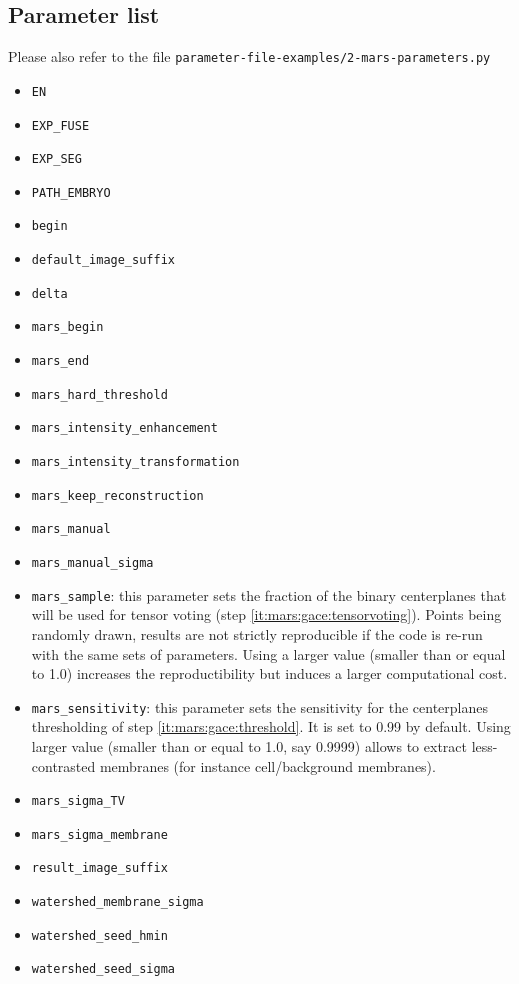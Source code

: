 \subsection{Parameter list}

Please also refer to the file
\texttt{parameter-file-examples/2-mars-parameters.py}

\begin{itemize}
\itemsep -1ex
\item \texttt{EN}
\item \texttt{EXP\_FUSE}
\item \texttt{EXP\_SEG}
\item \texttt{PATH\_EMBRYO}
\item \texttt{begin}
\item \texttt{default\_image\_suffix}
\item \texttt{delta}
\item \texttt{mars\_begin}
\item \texttt{mars\_end}
\item \texttt{mars\_hard\_threshold}
\item \texttt{mars\_intensity\_enhancement}
\item \texttt{mars\_intensity\_transformation}
\item \texttt{mars\_keep\_reconstruction}
\item \texttt{mars\_manual}
\item \texttt{mars\_manual\_sigma}
\item \texttt{mars\_sample}: this parameter sets the fraction of the binary centerplanes that will be used for tensor voting (step \ref{it:mars:gace:tensorvoting}). Points being randomly drawn, results are not strictly reproducible if the code is re-run with the same sets of parameters. Using a larger value (smaller than or equal to 1.0) increases the reproductibility but induces a larger computational cost.
\item \texttt{mars\_sensitivity}: this parameter sets the sensitivity for the centerplanes thresholding of step \ref{it:mars:gace:threshold}. It is set to 0.99 by default. Using larger value (smaller than or equal to 1.0, say 0.9999) allows to extract less-contrasted membranes (for instance cell/background membranes).
\item \texttt{mars\_sigma\_TV}
\item \texttt{mars\_sigma\_membrane}
\item \texttt{result\_image\_suffix}
\item \texttt{watershed\_membrane\_sigma}
\item \texttt{watershed\_seed\_hmin}
\item \texttt{watershed\_seed\_sigma}
\end{itemize}